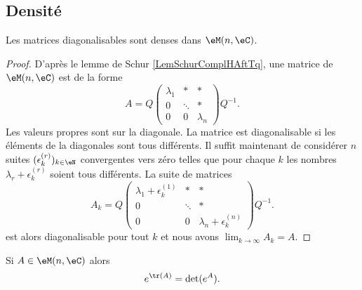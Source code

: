 \subsection{Densité}

\begin{proposition}     \label{PropDigDensVxzPuo}
    Les matrices diagonalisables sont denses dans \( \eM(n,\eC)\).
\end{proposition}

\begin{proof}
    D'après le lemme de Schur \ref{LemSchurComplHAftTq}, une matrice de \( \eM(n,\eC)\) est de la forme
    \begin{equation}
        A=Q\begin{pmatrix}
            \lambda_1    &   *    &   *    \\
              0  &   \ddots    &   *    \\
            0    &   0    &   \lambda_n
        \end{pmatrix}Q^{-1}.
    \end{equation}
    Les valeurs propres sont sur la diagonale. La matrice est diagonalisable si les éléments de la diagonales sont tous différents. Il suffit maintenant de considérer \( n\) suites \( (\epsilon^{(r)}_k)_{k\in\eN}\) convergentes vers zéro telles que pour chaque \( k\) les nombres \( \lambda_r+\epsilon^{(r)}_k\) soient tous différents. La suite de matrices
    \begin{equation}
        A_k=Q\begin{pmatrix}
            \lambda_1+\epsilon^{(1)}_k    &   *    &   *    \\
              0  &   \ddots    &   *    \\
              0    &   0    &   \lambda_n+\epsilon^{(n)}_k
        \end{pmatrix}Q^{-1}.
    \end{equation}
    est alors diagonalisable pour tout \( k\) et nous avons \( \lim_{k\to \infty} A_k=A\).
\end{proof}

\begin{proposition}
    Si \( A\in\eM(n,\eC)\) alors
    \begin{equation}
        e^{\tr(A)}=\det( e^{A}).
    \end{equation}
\end{proposition}

